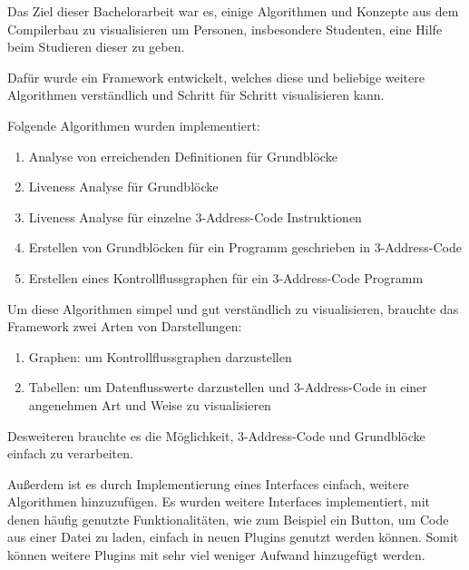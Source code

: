 Das Ziel dieser Bachelorarbeit war es,
einige Algorithmen und Konzepte
aus dem Compilerbau zu visualisieren
um Personen, insbesondere Studenten,
eine Hilfe beim Studieren dieser zu geben.

Dafür wurde ein Framework entwickelt, welches
diese und beliebige weitere Algorithmen verständlich
und Schritt für Schritt visualisieren kann.

Folgende Algorithmen wurden implementiert:
\begin{enumerate}
  \item Analyse von erreichenden Definitionen für Grundblöcke 
  \item Liveness Analyse für Grundblöcke 
  \item Liveness Analyse für einzelne 3-Address-Code Instruktionen
  \item Erstellen von Grundblöcken für ein Programm geschrieben in 3-Address-Code
  \item Erstellen eines Kontrollflussgraphen für ein 3-Address-Code Programm
\end{enumerate}

Um diese Algorithmen simpel und gut verständlich zu visualisieren, 
brauchte das Framework zwei Arten von Darstellungen:
\begin{enumerate}
  \item Graphen: um Kontrollflussgraphen darzustellen
  \item Tabellen: um Datenflusswerte darzustellen
    und 3-Address-Code in einer angenehmen Art und Weise zu visualisieren
\end{enumerate}
Desweiteren brauchte es die Möglichkeit, 3-Address-Code
und Grundblöcke einfach zu verarbeiten.


Außerdem ist es durch Implementierung eines Interfaces einfach, 
weitere Algorithmen hinzuzufügen.
Es wurden weitere Interfaces implementiert, mit 
denen häufig genutzte Funktionalitäten, wie zum Beispiel 
ein Button, um Code aus einer Datei zu laden, einfach in neuen
Plugins genutzt werden können. Somit können weitere Plugins
mit sehr viel weniger Aufwand hinzugefügt werden.
